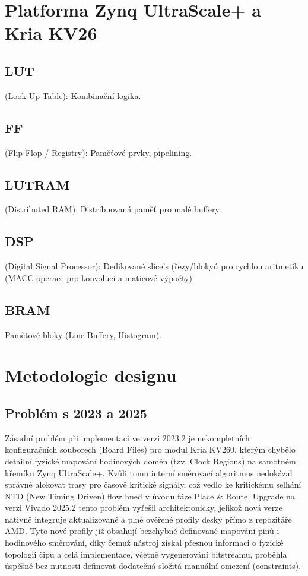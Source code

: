 \documentclass[FM,DP]{tulthesis}
\begin{document}
\section{Platforma Zynq UltraScale+ a Kria KV26}
\subsection{LUT}
(Look-Up Table): Kombinační logika.
\subsection{FF}
(Flip-Flop / Registry): Paměťové prvky, pipelining.
\subsection{LUTRAM}
(Distributed RAM): Distribuovaná paměť pro malé buffery.
\subsection{DSP}
(Digital Signal Processor): Dedikované slice's (řezy/blokyú pro rychlou aritmetiku (MACC operace pro konvoluci a maticové výpočty).
\subsection{BRAM}
Paměťové bloky (Line Buffery, Histogram).

\section{Metodologie designu}

\subsection{Problém s 2023 a 2025}

Zásadní problém při implementaci ve verzi 2023.2 je nekompletních
konfiguračních souborech (Board Files) pro modul Kria KV260, kterým chybělo
detailní fyzické mapování hodinových domén (tzv. Clock Regions) na samotném
křemíku Zynq UltraScale+. Kvůli tomu interní směrovací algoritmus nedokázal
správně alokovat trasy pro časově kritické signály, což vedlo ke kritickému
selhání NTD (New Timing Driven) flow hned v úvodu fáze Place \& Route. Upgrade
na verzi Vivado 2025.2 tento problém vyřešil architektonicky, jelikož nová
verze nativně integruje aktualizované a plně ověřené profily desky přímo z
repozitáře AMD. Tyto nové profily již obsahují bezchybně definované mapování
pinů i hodinového směrování, díky čemuž nástroj získal přesnou informaci o
fyzické topologii čipu a celá implementace, včetně vygenerování bitstreamu,
proběhla úspěšně bez nutnosti definovat dodatečná složitá manuální omezení
(constraints).
\end{document}
